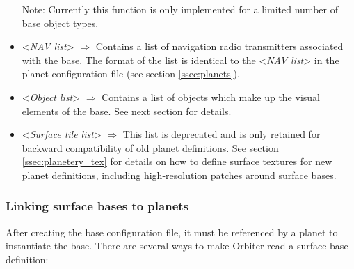 \documentclass[Orbiter Developer Manual.tex]{subfiles}
\begin{document}
\begin{itemize}
Note: Currently this function is only implemented for a limited number of base object types.
\item <\textit{NAV list}> $\Rightarrow$ Contains a list of navigation radio transmitters associated with the base. The format of the list is identical to the <\textit{NAV list}> in the planet configuration file (see section \ref{ssec:planets}).
\item <\textit{Object list}> $\Rightarrow$ Contains a list of objects which make up the visual elements of the base. See next section for details.
\item <\textit{Surface tile list}> $\Rightarrow$ This list is deprecated and is only retained for backward compatibility of old planet definitions. See section \ref{ssec:planetery_tex} for details on how to define surface textures for new planet definitions, including high-resolution patches around surface bases.
\end{itemize}


\subsubsection*{Linking surface bases to planets}
After creating the base configuration file, it must be referenced by a planet to instantiate the base. There are several ways to make Orbiter read a surface base definition:
\end{document}
